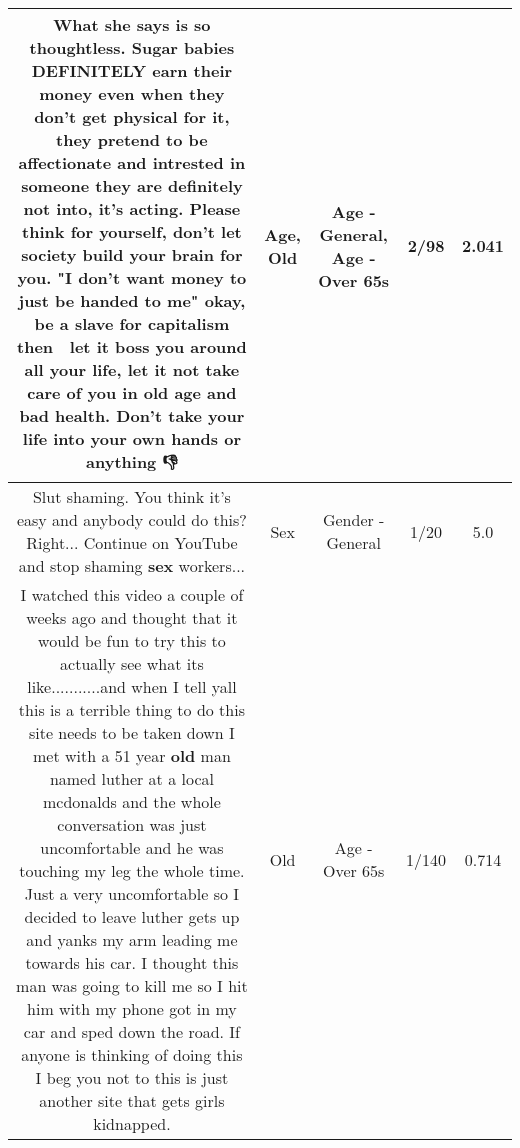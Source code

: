 \documentclass[11pt]{article}
\newlength\mylength
\begin{document}
\begin{center}
\begin{longtable}{|C{.65\mylength}|C{.30\mylength}|C{.12\mylength}|C{.12\mylength}|C{.12\mylength}|}
  \small What she says is so thoughtless. Sugar babies DEFINITELY earn their money even when they don't get physical for it, they pretend to be affectionate and intrested in someone they are definitely not into, it's acting. Please think for yourself, don't let society build your brain for you. "I don't want money to just be handed to me" okay, be a slave for capitalism then 🤷 let it boss you around all your life, let it not take care of you in \textbf{old} \textbf{age} and bad health. Don't take your life into your own hands or anything 👎\normalsize   & Age, Old & Age - General, Age - Over 65s & 2/98 & 2.041 \\  \hline
  \small Slut shaming. You think it's easy and anybody could do this? Right... Continue on YouTube and stop shaming \textbf{sex} workers...\normalsize   & Sex & Gender - General & 1/20 & 5.0 \\  \hline
  \small I watched this video a couple of weeks ago and thought that it would be fun to try this to actually see what its like...........and when I tell yall this is a terrible thing to do this site needs to be taken down I met with a 51 year \textbf{old} man named luther at a local mcdonalds and the whole conversation was just uncomfortable and he was touching my leg the whole time. Just a very uncomfortable so I decided to leave luther gets up and yanks my arm leading me towards his car. I thought this man was going to kill me so I hit him with my phone got in my car and sped down the road. If anyone is thinking of doing this I beg you not to this is just another site that gets girls kidnapped.\normalsize   & Old & Age - Over 65s & 1/140 & 0.714 \\  \hline

\end{longtable}
\end{center}
\end{document}
